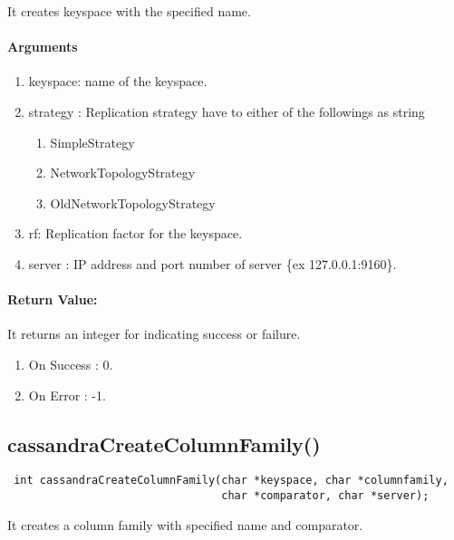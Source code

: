 \documentclass[12 pt , a4paper ]{report}
\begin{document}
  It creates keyspace with the specified name.

  \paragraph{Arguments}
  \begin{enumerate}
   \item keyspace: name of the keyspace.
   \item strategy : Replication strategy have to either of the followings as string
		    \begin{enumerate}
		     \item SimpleStrategy
		     \item NetworkTopologyStrategy
		     \item OldNetworkTopologyStrategy
		    \end{enumerate}

   \item rf:       Replication factor for the keyspace.
   \item server : IP address and port number of server \{ex 127.0.0.1:9160\}.
  \end{enumerate}

 \paragraph{Return Value:}
 It returns an integer for indicating success or failure.
\begin{enumerate}
 \item On Success : 0.
 \item On Error   : -1.
\end{enumerate}

\subsection{cassandraCreateColumnFamily()}
\begin{verbatim}
 int cassandraCreateColumnFamily(char *keyspace, char *columnfamily,
                                 char *comparator, char *server);
\end{verbatim}

  It creates a column family with specified name and comparator.
\end{document}
